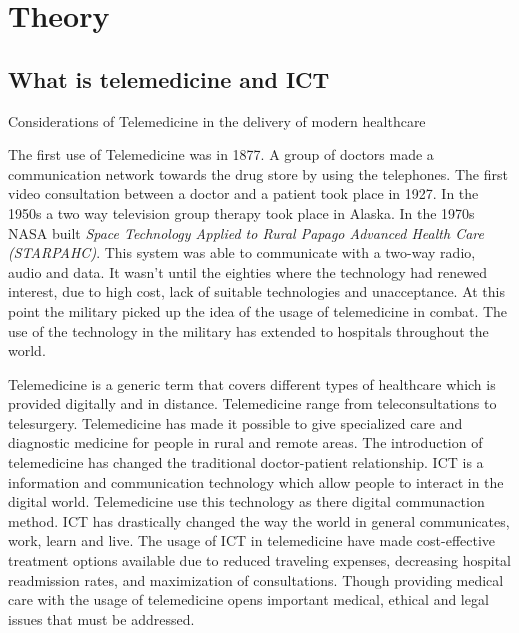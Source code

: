 \chapter{Theory}


\section{What is telemedicine and ICT}

Considerations of Telemedicine in the delivery of modern healthcare



The first use of Telemedicine was in 1877. A group of doctors made a communication network towards the drug store by using the telephones. The first video consultation between a doctor and a patient took place in 1927. In the 1950s a two way television group therapy took place in Alaska. In the 1970s NASA built \textit{Space Technology Applied to Rural Papago Advanced Health Care (STARPAHC)}. This system was able to communicate with a two-way radio, audio and data. It wasn't until the eighties where the technology had renewed interest, due to high cost, lack of suitable technologies and unacceptance. At this point the military picked up the idea of the usage of telemedicine in combat. The use of the technology in the military has extended to hospitals throughout the world. 


Telemedicine is a generic term that covers different types of healthcare which is provided digitally and in distance. Telemedicine range from teleconsultations to telesurgery. Telemedicine has made it possible to give specialized care and diagnostic medicine for people in rural and remote areas. The introduction of telemedicine has changed the traditional doctor-patient relationship. 
ICT is a information and communication technology which allow people to interact in the digital world. Telemedicine use this technology as there digital communaction method. ICT has drastically changed the way the world in general communicates, work, learn and live.   
The usage of ICT in telemedicine have made cost-effective treatment options available due to reduced traveling expenses, decreasing hospital readmission rates, and maximization of consultations. Though providing medical care with the usage of telemedicine opens important medical, ethical and legal issues that must be addressed\cite{considerations}.

